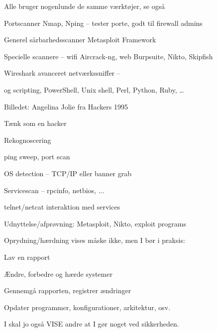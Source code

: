 \documentclass[Screen16to9,17pt]{foils}
\begin{document}

\begin{list2}
\item Alle bruger nogenlunde de samme værktøjer, se også 
\item Portscanner Nmap, Nping -- tester porte, godt til firewall admins 
\item Generel sårbarhedsscanner Metasploit Framework 
\item Specielle scannere -- wifi Aircrack-ng, web Burpsuite, Nikto, Skipfish 
\item Wireshark avanceret netværkssniffer -- 
\item og scripting, PowerShell, Unix shell, Perl, Python, Ruby, \ldots
\end{list2}

Billedet: Angelina Jolie fra Hackers 1995



\begin{list1}
\item Tænk som en hacker
\item Rekognoscering
\begin{list2}
\item ping sweep, port scan
\item OS detection -- TCP/IP eller banner grab
\item Servicescan -- rpcinfo, netbios, ...
\item telnet/netcat interaktion med services
\end{list2}
\item Udnyttelse/afprøvning: Metasploit, Nikto, exploit programs
\item Oprydning/hærdning vises måske ikke, men I bør i praksis:
\begin{list2}
\item Lav en rapport
\item Ændre, forbedre og hærde systemer
\item Gennemgå rapporten, registrer ændringer
\item Opdater programmer, konfigurationer, arkitektur, osv.
\end{list2}
\item I skal jo også VISE andre at I gør noget ved sikkerheden.
\end{list1}
\end{document}

